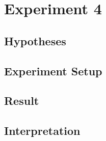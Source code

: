 \documentclass[./\jobname.tex]{subfiles}
\begin{document}
\chapter {Experiment 4}
\label{chap:experimet_4}

\section{Hypotheses}

\section{Experiment Setup}

\section{Result}

\section{Interpretation}
\end{document}
